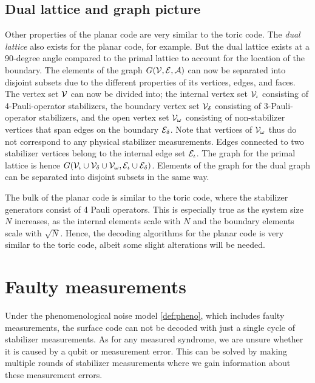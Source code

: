 \subsection{Dual lattice and graph picture}
Other properties of the planar code are very similar to the toric code. The \emph{dual lattice} also exists for the planar code, for example. But the dual lattice exists at a 90-degree angle compared to the primal lattice to account for the location of the boundary. The elements of the graph $G(\mathcal{V},\mathcal{E},\mathcal{A})$ can now be separated into disjoint subsets due to the different properties of its vertices, edges, and faces. The vertex set $\mathcal{V}$ can now be divided into; the internal vertex set $\mathcal{V}_\iota$ consisting of 4-Pauli-operator stabilizers, the boundary vertex set $\mathcal{V}_{\delta}$ consisting of 3-Pauli-operator stabilizers, and the open vertex set $\mathcal{V}_\omega$ consisting of non-stabilizer vertices that span edges on the boundary $\mathcal{E}_{\delta}$. Note that vertices of $\mathcal{V}_\omega$ thus do not correspond to any physical stabilizer measurements. Edges connected to two stabilizer vertices belong to the internal edge set $\mathcal{E}_\iota$. The graph for the primal lattice is hence $G(\mathcal{V}_\iota\cup \mathcal{V}_\delta \cup \mathcal{V}_\omega, \mathcal{E}_\iota\cup \mathcal{E}_\delta)$. Elements of the graph for the dual graph can be separated into disjoint subsets in the same way.

\vspace{1em}
The bulk of the planar code is similar to the toric code, where the stabilizer generators consist of 4 Pauli operators. This is especially true as the system size $N$ increases, as the internal elements scale with $N$ and the boundary elements scale with $\sqrt{N}$. Hence, the decoding algorithms for the planar code is very similar to the toric code, albeit some slight alterations will be needed. 

\section{Faulty measurements}\label{sec:faultymeasurments}

Under the phenomenological noise model \ref{def:pheno}, which includes faulty measurements, the surface code can not be decoded with just a single cycle of stabilizer measurements. As for any measured syndrome, we are unsure whether it is caused by a qubit or measurement error. This can be solved by making multiple rounds of stabilizer measurements where we gain information about these measurement errors. 

